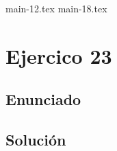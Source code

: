 \documentclass[a4paper,12pt]{article}
\begin{document}
\tableofcontents

{main-12.tex}
{main-18.tex}

\newpage
\section{Ejercico 23}
\subsection{Enunciado}
\subsection{Solución}
\end{document}
